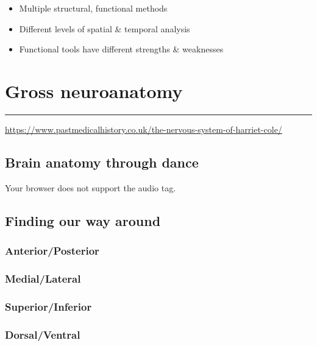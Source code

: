 \documentclass[]{article}
\providecommand{\tightlist}{%
  \setlength{\itemsep}{0pt}\setlength{\parskip}{0pt}}
\begin{document}
\begin{itemize}
\tightlist
\item
  Multiple structural, functional methods
\item
  Different levels of spatial \& temporal analysis
\item
  Functional tools have different strengths \& weaknesses
\end{itemize}

\section{Gross neuroanatomy}\label{gross-neuroanatomy}

\begin{center}\rule{0.5\linewidth}{\linethickness}\end{center}


\url{https://www.pastmedicalhistory.co.uk/the-nervous-system-of-harriet-cole/}

\subsection{Brain anatomy through
dance}\label{brain-anatomy-through-dance}

 Your browser does not support the audio tag.

\subsection{Finding our way around}\label{finding-our-way-around}

\subsubsection{Anterior/Posterior}\label{anteriorposterior}

\subsubsection{Medial/Lateral}\label{mediallateral}

\subsubsection{Superior/Inferior}\label{superiorinferior}

\subsubsection{Dorsal/Ventral}\label{dorsalventral}
\end{document}

